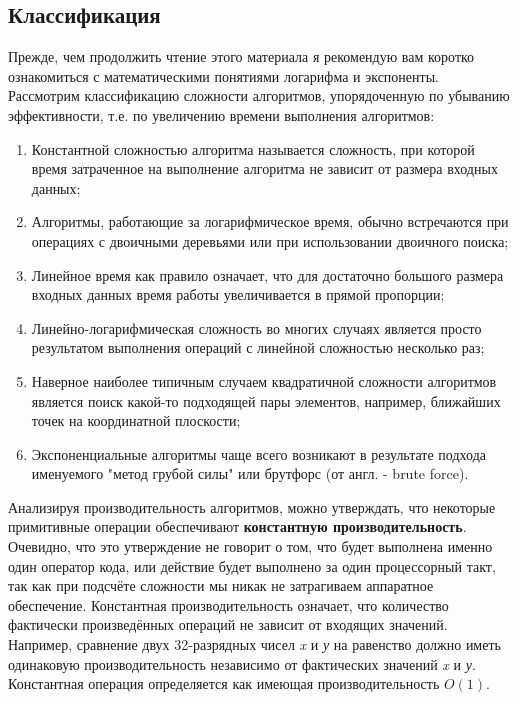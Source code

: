 \documentclass[fontsize=14bp]{report}
\begin{document}
\subsection{Классификация} Прежде, чем продолжить чтение этого материала я рекомендую вам коротко ознакомиться с математическими понятиями логарифма и экспоненты.
Рассмотрим классификацию сложности алгоритмов, упорядоченную по убыванию эффективности, т.е. по увеличению времени выполнения алгоритмов:
\begin{enumerate}
    \item Константной сложностью алгоритма называется сложность, при которой время затраченное на выполнение алгоритма не зависит от размера входных данных;
    \item Алгоритмы, работающие за логарифмическое время, обычно встречаются при операциях с двоичными деревьями или при использовании двоичного поиска;
    \item Линейное время как правило означает, что для достаточно большого размера входных данных время работы увеличивается в прямой пропорции;
    \item Линейно-логарифмическая сложность во многих случаях является просто результатом выполнения операций с линейной сложностью несколько раз;
    \item Наверное наиболее типичным случаем квадратичной сложности алгоритмов является поиск какой-то подходящей пары элементов, например, ближайших точек на координатной плоскости;
    \item Экспоненциальные алгоритмы чаще всего возникают в результате подхода именуемого "метод грубой силы" или брутфорс (от англ. - brute force).
\end{enumerate}

Анализируя производительность алгоритмов, можно утверждать, что некоторые примитивные операции обеспечивают \textbf{константную производительность}. Очевидно, что это утверждение не говорит о том, что будет выполнена именно один оператор кода, или действие будет выполнено за один процессорный такт, так как при подсчёте сложности мы никак не затрагиваем аппаратное обеспечение. Константная производительность означает, что количество фактически произведённых операций не зависит от входящих значений. Например, сравнение двух 32-разрядных чисел \textit{x} и \textit{у} на равенство должно иметь одинаковую производительность независимо от фактических значений \textit{x} и \textit{у}. Константная операция определяется как имеющая производительность $O(1)$.
\end{document}
